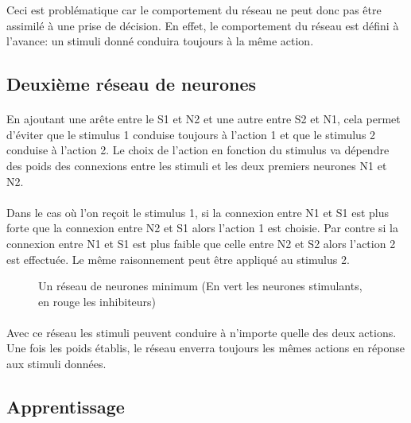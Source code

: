 Ceci est problématique car le comportement du réseau ne peut donc pas
être assimilé à une prise de décision. En effet, le comportement du réseau
est défini à l'avance: un stimuli donné conduira toujours à la même action.

\subsection{Deuxième réseau de neurones}
\paragraph{}
En ajoutant une arête entre le S1 et N2 et une autre entre S2 et N1, cela
permet d'éviter que le stimulus 1 conduise toujours à l'action 1 et que le
stimulus 2 conduise à l'action 2. Le choix de l'action en fonction du stimulus
va dépendre des poids des connexions entre les stimuli et les deux premiers
neurones N1 et N2.

\paragraph{}
Dans le cas où l'on reçoit le stimulus 1, si la connexion entre N1 et S1 est
plus forte que la connexion entre N2 et S1 alors l'action 1 est choisie.
Par contre si la connexion entre N1 et S1 est plus faible que celle entre
N2 et S2 alors l'action 2 est effectuée. Le même raisonnement peut être
appliqué au stimulus 2.

\begin{figure}[!h]
  \begin{center}
    
  \end{center}
  \caption{Un réseau de neurones minimum (En vert les neurones stimulants, en rouge les inhibiteurs)}
  \label{reseau2}
\end{figure}

\paragraph{}
Avec ce réseau les stimuli peuvent conduire à n'importe quelle des deux
actions. Une fois les poids établis, le réseau enverra toujours les mêmes
actions en réponse aux stimuli données.

\subsection{Apprentissage}
